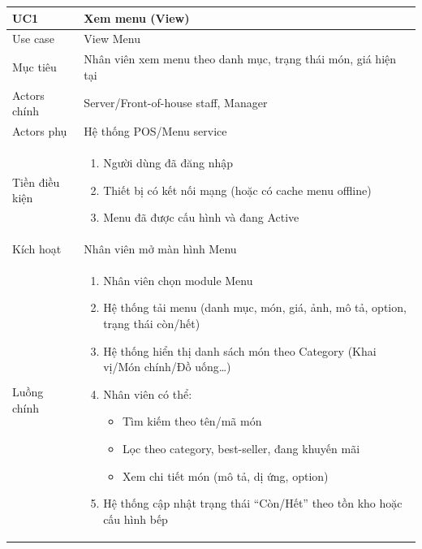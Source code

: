 \begin{longtable}{|>{\raggedright\arraybackslash}p{}|>{\raggedright\arraybackslash}p{}|}
\hline
\textbf{UC1} & \textbf{Xem menu (View)} \\
\hline
Use case & View Menu \\
\hline
Mục tiêu & Nhân viên xem menu theo danh mục, trạng thái món, giá hiện tại \\
\hline
Actors chính & Server/Front-of-house staff, Manager \\
\hline
Actors phụ & Hệ thống POS/Menu service \\
\hline
Tiền điều kiện &
\vspace{-0.5em}
\begin{enumerate}[leftmargin=*]
\item Người dùng đã đăng nhập
\item Thiết bị có kết nối mạng (hoặc có cache menu offline)
\item Menu đã được cấu hình và đang Active
\end{enumerate}
\vspace{-0.5em}
\\
\hline
Kích hoạt & Nhân viên mở màn hình Menu \\
\hline
Luồng chính &
\vspace{-0.5em}
\begin{enumerate}[leftmargin=*]
\item Nhân viên chọn module Menu
\item Hệ thống tải menu (danh mục, món, giá, ảnh, mô tả, option, trạng thái còn/hết)
\item Hệ thống hiển thị danh sách món theo Category (Khai vị/Món chính/Đồ uống…)
\item Nhân viên có thể:
\vspace{-0.5em}
\begin{itemize}[leftmargin=*]
\item Tìm kiếm theo tên/mã món
\item Lọc theo category, best-seller, đang khuyến mãi
\item Xem chi tiết món (mô tả, dị ứng, option)
\end{itemize}
\vspace{-0.5em}
\item Hệ thống cập nhật trạng thái “Còn/Hết” theo tồn kho hoặc cấu hình bếp
\end{enumerate}

\end{longtable}
